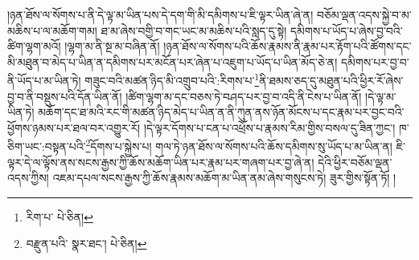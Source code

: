 །ཉན་ཐོས་ལ་སོགས་པ་ནི་དེ་ལྟ་མ་ཡིན་པས་དེ་དག་གི་མི་དམིགས་པ་ཇི་ལྟར་ཡིན་ཞེ་ན། བཅོམ་ལྡན་འདས་སྐྱེ་བ་མ་མཆིས་པ་ལ་མཆོག་གམ། ཐ་མ་ཞེས་བགྱི་བ་གང་ཡང་མ་མཆིས་པའི་སླད་དུ་སྟེ། དམིགས་པ་ཡོད་པ་ཞེས་བྱ་བའི་ཚིག་ལྷག་མའོ། །ལྷག་མ་ནི་སྔ་མ་བཞིན་ནོ། །ཉན་ཐོས་ལ་སོགས་པའི་ཆོས་རྣམས་ནི་རྣམ་པར་རྟོག་པའི་ཚོགས་དང་མི་མཐུན་བ་མེད་པ་ཡིན་ན་དམིགས་པར་མངོན་པར་ཞེན་པ་འཇུག་པ་ཡོད་པ་ཡིན་མོད་ཅེ་ན། དམིགས་པར་བྱ་བ་ནི་ཡོད་པ་མ་ཡིན་ཏེ། གཟུང་བའི་མཚན་ཉིད་མི་འགྲུབ་པའི་:རིགས་པ་\footnote{རིག་པ་  པེ་ཅིན། }ནི་ཐམས་ཅད་དུ་མཐུན་པའི་ཕྱིར་རོ་ཞེས་བྱ་བ་ནི་བསྡུས་པའི་དོན་ཡིན་ནོ། །ཚིག་ལྷག་མ་དང་བཅས་ཏེ་བཤད་པར་བྱ་བ་འདི་ནི་ངེས་པ་ཡིན་ནོ། །དེ་ལྟ་མ་ཡིན་ཏེ། མཆོག་དང་ཐ་མའི་རང་གི་མཚན་ཉིད་མེད་པ་ཡིན་ན་ནི་ཀུན་ནས་ཉོན་མོངས་པ་དང་རྣམ་པར་བྱང་བའི་ཕྱོགས་ཉམས་པར་ཐལ་བར་འགྱུར་རོ། །དེ་ལྟར་དོགས་པ་ངན་པ་འཕྲོས་པ་རྣམས་རིམ་གྱིས་བསལ་དུ་ཟིན་ཀྱང་། ཁ་ཅིག་ཡང་:བསྟན་པའི་\footnote{བརྫུན་པའི་  སྣར་ཐང་།  པེ་ཅིན། }དོགས་པ་སྐྱེས་པ། གལ་ཏེ་ཉན་ཐོས་ལ་སོགས་པའི་ཆོས་དམིགས་སུ་ཡོད་པ་མ་ཡིན་ན། ཇི་ལྟར་དེ་ལ་ལྟོས་ནས་སངས་རྒྱས་ཀྱི་ཆོས་མཆོག་ཡིན་པར་རྣམ་པར་གཞག་པར་བྱ་ཞེ་ན། དེའི་ཕྱིར་བཅོམ་ལྡན་འདས་ཀྱིས། འཇམ་དཔལ་སངས་རྒྱས་ཀྱི་ཆོས་རྣམས་མཆོག་མ་ཡིན་ནམ་ཞེས་གསུངས་ཏེ། ཟུར་གྱིས་སྟོན་ཏོ། །

